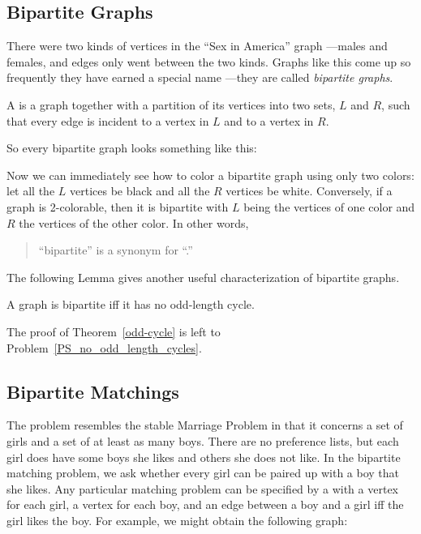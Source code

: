 \subsection{Bipartite Graphs}\label{bipartitesubsec}
There were two kinds of vertices in the ``Sex in America'' graph ---males
and females, and edges only went between the two kinds.  Graphs like this
come up so frequently they have earned a special name ---they are called
\emph{bipartite graphs}.

\begin{definition}
A  is a graph together with a partition of its
vertices into two sets, $L$ and $R$, such that every edge is incident to a
vertex in $L$ and to a vertex in $R$.
\end{definition}

So every bipartite graph looks something like this:


Now we can immediately see how to color a bipartite graph using only two
colors: let all the $L$ vertices be black and all the $R$ vertices be
white.  Conversely, if a graph is 2-colorable, then it is bipartite with
$L$ being the vertices of one color and $R$ the vertices of the other
color.  In other words,
\begin{quote}
``bipartite'' is a synonym for ``.''
\end{quote}
The following Lemma gives another useful characterization of bipartite
graphs.

{\begin{theorem}\label{odd-cycle}
A graph is bipartite iff it has no odd-length cycle.
\end{theorem}}
The proof of Theorem~\ref{odd-cycle} is left to
Problem~\ref{PS_no_odd_length_cycles}.

\subsection{Bipartite Matchings}

The  problem resembles the stable Marriage
Problem in that it concerns a set of girls and a set of at least as many
boys.  There are no preference lists, but each girl does have some boys
she likes and others she does not like.  In the bipartite matching
problem, we ask whether every girl can be paired up with a boy that she
likes.  Any particular matching problem can be specified by a
 with a vertex for each girl, a vertex for each boy,
and an edge between a boy and a girl iff the girl likes the boy.  For
example, we might obtain the following graph:

